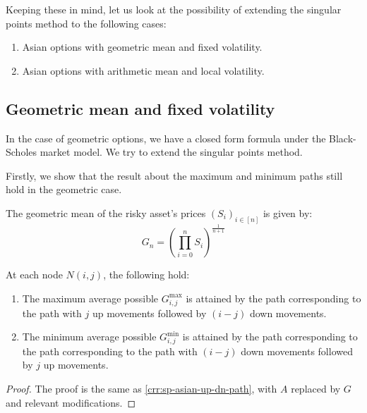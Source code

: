 Keeping these in mind, let us look at the possibility of extending the singular points method to the following cases:
\begin{enumerate}
\item Asian options with geometric mean and fixed volatility.
\item Asian options with arithmetic mean and local volatility.
\end{enumerate}



\subsection{Geometric mean and fixed volatility}
\label{subsec:gm-fixed-vol}

In the case of geometric options, we have a closed form formula under the Black-Scholes market model. We try to extend the singular points method.

Firstly, we show that the result about the maximum and minimum paths still hold in the geometric case.

\begin{dfn}
	The geometric mean of the risky asset's prices $ (S_i)_{i \in [n]} $ is given by:
	\begin{equation}
		\label{eq:gm}
		G_{n} = \left( \prod_{i=0}^n S_i \right) ^{\frac{1}{n+1}}
	\end{equation}
\end{dfn}


\begin{lmm}
	At each node $N(i,j)$, the following hold:
	\begin{enumerate}
	\item The maximum average possible $ G_{i,j}^{\max} $ is attained by the path corresponding to the path with $j$ up movements followed by $(i-j)$ down movements.
	\item The minimum average possible $ G_{i,j}^{\min} $ is attained by the path corresponding to the path corresponding to the path with $(i-j)$ down movements followed by $j$ up movements.
	\end{enumerate}
\end{lmm}

\begin{proof}
	The proof is the same as \ref{crr:sp-asian-up-dn-path}, with $A$ replaced by $G$ and relevant modifications.
\end{proof}


